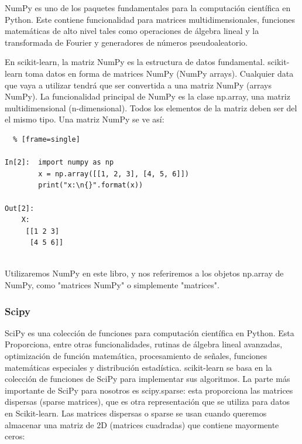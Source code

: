{\ttfamily NumPy} es uno de los paquetes fundamentales para la computación científica en Python. Este contiene funcionalidad para matrices multidimensionales, funciones matemáticas de alto nivel
tales como operaciones de álgebra lineal y la transformada de Fourier y 
generadores de números pseudoaleatorio.
                                
En  {\ttfamily  scikit-learn}, la matriz {\ttfamily NumPy} es la estructura de datos fundamental.  {\ttfamily  scikit-learn} toma datos en forma de matrices {\ttfamily NumPy} (NumPy arrays). Cualquier data que vaya a utilizar  tendrá que ser convertida a una matriz {\ttfamily NumPy} (arrays NumPy). La funcionalidad principal de {\ttfamily NumPy} es la clase {\ttfamily np.array}, 
una matriz multidimensional (n-dimensional). Todos los elementos de la matriz deben ser del
el mismo tipo. Una matriz NumPy se ve así:\\

\begin{lstlisting}  % [frame=single]

In[2]:  import numpy as np
        x = np.array([[1, 2, 3], [4, 5, 6]])
        print("x:\n{}".format(x))
	
Out[2]:
    X:
     [[1 2 3]      
      [4 5 6]] 
   
\end{lstlisting}

 Utilizaremos NumPy en este libro, y nos referiremos a los objetos np.array de NumPy,   como "matrices NumPy"{} o simplemente "matrices"{}.


\subsubsection{Scipy}
{ \ttfamily SciPy} es una colección de funciones para computación científica en Python. Esta Proporciona, entre otras funcionalidades, rutinas de álgebra lineal avanzadas, optimización de función matemática, procesamiento de señales, funciones matemáticas especiales y distribución estadística. scikit-learn se basa en la colección de funciones de  {\ttfamily SciPy} para implementar sus algoritmos. La parte más importante de {\ttfamily SciPy}  para nosotros es {\ttfamily scipy.sparse}: esta proporciona las matrices dispersas (sparse matrices), que es otra representación que se utiliza para datos en {\ttfamily Scikit-learn}. Las matrices dispersas o sparse se usan cuando queremos almacenar una matriz de  2D (matrices cuadradas) que contiene mayormente ceros:

